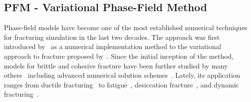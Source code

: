 \subsection{PFM - Variational Phase-Field Method}

Phase-field models have become one of the most established numerical techniques for fracturing simulation in the last two decades. 
The approach was first introduced by~\cite{Bourdin2000} as a numerical implementation method to the variational approach to fracture proposed by~\cite{Francfort1998}. 
Since the initial inception of the method, models for brittle and cohesive fracture have been further studied by many others~\cite{Bourdin2008, Hakim2009, Amor2009,  Kuhn2010, Verhoosel2010,  Pham2011, Vignollet2014,  Ambati2015, Marigo2016, Wu2017, Tanne2018,  Sargado2018} including advanced numerical solution schemes~\cite{Gerasimov2016, Farrell2017}.
Lately, its application ranges from ductile fracturing~\cite{Ambati2015, Miehe2015_thermo,Kuhn2016,Alessi2017} to fatigue~\cite{Alessi2018,Seiler2018}, desiccation fracture~\cite{Maurini2013, Cajuhi2017}, and dynamic fracturing~\cite{Bourdin2011, Borden2012,Hofacker2012, Schluter2014, Li2016}.

